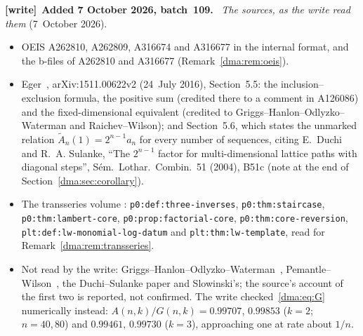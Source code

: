 \documentclass[11pt,letterpaper]{article}
\theoremstyle{remark}\newtheorem{remark}[theorem]{Remark}
\newcommand{\file}[1]{\nolinkurl{#1}}
\newenvironment{writenote}[1][]{\par\smallskip\begingroup\small
 \noindent\textbf{[write]}\if\relax\detokenize{#1}\relax\else~\textbf{#1.}\fi\ }%
 {\par\endgroup\smallskip}
\begin{document}
\begin{writenote}[Added 7 October 2026, batch~109]
\emph{The sources, as the write read them} (7~October 2026).
\begin{itemize}\raggedright
\item OEIS A262810, A262809, A316674 and A316677 in the internal format, and
 the b-files of A262810 and A316677 (Remark~\ref{dma:rem:oeis}).
\item Eger~\cite{eger}, arXiv:1511.00622v2 (24~July 2016), Section~5.5: the
 inclusion--exclusion formula, the positive sum (credited there to a comment
 in A126086) and the fixed-dimensional equivalent (credited to
 Griggs--Hanlon--Odlyzko--Waterman and Raichev--Wilson); and Section~5.6,
 which states the unmarked relation $\widetilde A_n(1)=2^{n-1}a_n$ for every
 number of sequences, citing E.~Duchi and R.~A. Sulanke, ``The $2^{n-1}$
 factor for multi-dimensional lattice paths with diagonal steps'',
 S\'em.\ Lothar.\ Combin.\ 51 (2004), B51c (note at the end of
 Section~\ref{dma:sec:corollary}).
\item The transseries volume
 :
 \file{p0:def:three-inverses}, \file{p0:thm:staircase},
 \file{p0:thm:lambert-core}, \file{p0:prop:factorial-core},
 \file{p0:thm:core-reversion}, \file{plt:def:lw-monomial-log-datum} and
 \file{plt:thm:lw-template}, read for Remark~\ref{dma:rem:transseries}.
\item Not read by the write: Griggs--Hanlon--Odlyzko--Waterman~\cite{ghow},
 Pemantle--Wilson~\cite{pw}, the Duchi--Sulanke paper and Slowinski's; the
 source's account of the first two is reported, not confirmed. The write
 checked~\eqref{dma:eq:G} numerically instead: $A(n,k)/G(n,k)=0.99707$,
 $0.99853$ ($k=2$; $n=40,80$) and $0.99461$, $0.99730$ ($k=3$), approaching
 one at rate about $1/n$.
\end{itemize}


\end{writenote}
\end{document}

